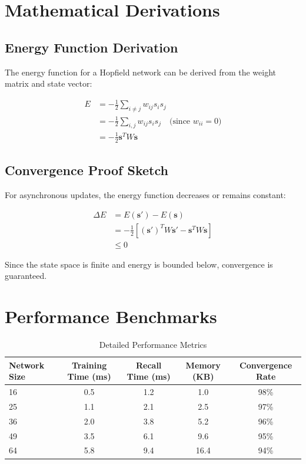 \documentclass[11pt,a4paper]{article}
\begin{document}
\section{Mathematical Derivations}

\subsection{Energy Function Derivation}

The energy function for a Hopfield network can be derived from the weight matrix and state vector:

\begin{align}
E &= -\frac{1}{2} \sum_{i \neq j} w_{ij} s_i s_j \\
&= -\frac{1}{2} \sum_{i,j} w_{ij} s_i s_j \quad \text{(since } w_{ii} = 0\text{)} \\
&= -\frac{1}{2} \mathbf{s}^T W \mathbf{s}
\end{align}

\subsection{Convergence Proof Sketch}

For asynchronous updates, the energy function decreases or remains constant:

\begin{align}
\Delta E &= E(\mathbf{s}') - E(\mathbf{s}) \\
&= -\frac{1}{2}[(\mathbf{s}')^T W \mathbf{s}' - \mathbf{s}^T W \mathbf{s}] \\
&\leq 0
\end{align}

Since the state space is finite and energy is bounded below, convergence is guaranteed.

\section{Performance Benchmarks}

\begin{table}[H]
\centering
\caption{Detailed Performance Metrics}
\begin{tabular}{@{}lcccc@{}}
\toprule
Network Size & Training Time (ms) & Recall Time (ms) & Memory (KB) & Convergence Rate \\
\midrule
16 & 0.5 & 1.2 & 1.0 & 98\% \\
25 & 1.1 & 2.1 & 2.5 & 97\% \\
36 & 2.0 & 3.8 & 5.2 & 96\% \\
49 & 3.5 & 6.1 & 9.6 & 95\% \\
64 & 5.8 & 9.4 & 16.4 & 94\% \\
\bottomrule
\end{tabular}
\end{table}
\end{document}
